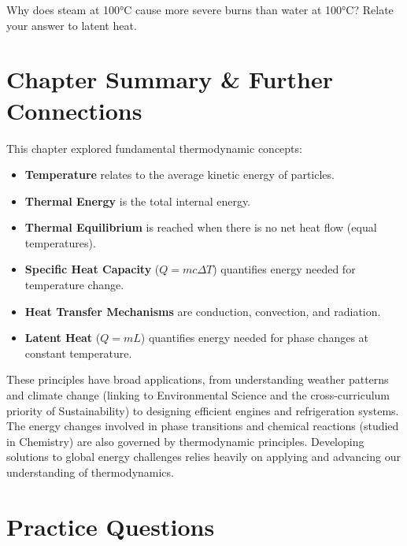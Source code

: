 \begin{stopandthink}
Why does steam at 100°C cause more severe burns than water at 100°C? Relate your answer to latent heat.
\end{stopandthink}


\FloatBarrier

\section{Chapter Summary & Further Connections}
\label{sec:thermo_summary}
\FloatBarrier

This chapter explored fundamental thermodynamic concepts:
\begin{itemize}
    \item \textbf{Temperature} relates to the average kinetic energy of particles.
    \item \textbf{Thermal Energy} is the total internal energy.
    \item \textbf{Thermal Equilibrium} is reached when there is no net heat flow (equal temperatures).
    \item \textbf{Specific Heat Capacity} (\(Q = mc\Delta T\)) quantifies energy needed for temperature change.
    \item \textbf{Heat Transfer Mechanisms} are conduction, convection, and radiation.
    \item \textbf{Latent Heat} (\(Q = mL\)) quantifies energy needed for phase changes at constant temperature.
\end{itemize}

These principles have broad applications, from understanding weather patterns and climate change (linking to Environmental Science and the cross-curriculum priority of Sustainability) to designing efficient engines and refrigeration systems. The energy changes involved in phase transitions and chemical reactions (studied in Chemistry) are also governed by thermodynamic principles. Developing solutions to global energy challenges relies heavily on applying and advancing our understanding of thermodynamics.

\FloatBarrier

\section{Practice Questions}
\label{sec:thermo_questions}
\FloatBarrier


